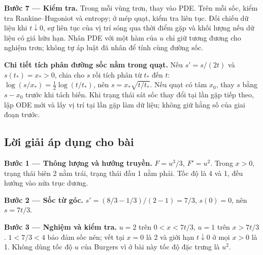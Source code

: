 \documentclass[10pt,a4paper]{article}
\begin{document}
\textbf{Bước 7 — Kiểm tra.} Trong mỗi vùng trơn, thay vào PDE. Trên mỗi sốc, kiểm tra Rankine–Hugoniot và entropy; ở mép quạt, kiểm tra liên tục. Đối chiếu dữ liệu khi $t\downarrow0$, sự liên tục của vị trí sóng qua thời điểm gặp và khối lượng nếu dữ liệu có giá hữu hạn. Nhân PDE với một hàm của $u$ chỉ giữ tương đương cho nghiệm trơn; không tự áp luật đã nhân để tính cùng đường sốc.

\textbf{Chi tiết tích phân đường sốc nằm trong quạt.} Nếu $s'=s/(2t)$ và $s(t_*)=x_*>0$, chia cho $s$ rồi tích phân từ $t_*$ đến $t$: $\log(s/x_*)=\frac12\log(t/t_*)$, nên $s=x_*\sqrt{t/t_*}$. Nếu quạt có tâm $x_0$, thay $s$ bằng $s-x_0$ trước khi tách biến. Khi trạng thái sát sốc thay đổi tại lần gặp tiếp theo, lập ODE mới và lấy vị trí tại lần gặp làm dữ liệu; không giữ hằng số của giai đoạn trước.
\subsection*{Lời giải áp dụng cho bài}
\textbf{Bước 1 — Thông lượng và hướng truyền.} $F=u^3/3$, $F'=u^2$. Trong $x>0$, trạng thái biên 2 nằm trái, trạng thái đầu 1 nằm phải. Tốc độ là 4 và 1, đều hướng vào nửa trục dương.

\textbf{Bước 2 — Sốc từ góc.} $s'=(8/3-1/3)/(2-1)=7/3$, $s(0)=0$, nên $s=7t/3$.

\textbf{Bước 3 — Nghiệm và kiểm tra.} $u=2$ trên $0<x<7t/3$, $u=1$ trên $x>7t/3$. $1<7/3<4$ bảo đảm sốc nén; vết tại $x=0$ là 2 và giới hạn $t\downarrow0$ ở mọi $x>0$ là 1. Không dùng tốc độ $u$ của Burgers vì ở bài này tốc độ đặc trưng là $u^2$.
\end{document}
